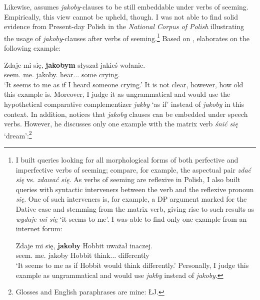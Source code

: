 \documentclass[output=paper
,modfonts
,nonflat]{langsci/langscibook}
\begin{document}
Likewise, \textcite{Wiemer2005} assumes \emph{jakoby}-clauses to be still embeddable under verbs of seeming. Empirically, this view cannot be upheld, though. I was not able to find solid evidence from Present-day Polish in the \emph{National Corpus of Polish} illustrating the usage of \emph{jakoby}-clauses after verbs of seeming.\footnote{I built queries looking for all morphological forms of both perfective and imperfective verbs of seeming; compare, for example, the aspectual pair \emph{zdać się} vs. \emph{zdawać się}. As verbs of seeming are reflexive in Polish, I also built queries with syntactic interveners between the verb and the reflexive pronoun \emph{się}. One of such interveners is, for example, a DP argument marked for the Dative case and stemming from the matrix verb, giving rise to such results as \emph{wydaje mi się} `it seems to me'. I was able to find only one example from an internet forum:

\ea \gll Zdaje mi się, \textbf{jakoby} Hobbit uważał inaczej. \\
		seem.{\thirdperson}{\sg} me.{\dat} {} jakoby Hobbit think.{\lptcp}.{\sg}.{\masc} differently \\
\glt	`It seems to me as if Hobbit would think differently.' 
\z
Personally, I judge this example as ungrammatical and would use \emph{jakby} instead of \emph{jakoby}.}
Based on \textcite{ojasiewicz1992}, \textcite{Wiemer2005} elaborates on the following example:

\ea \gll Zdaje mi się, \textbf{jakobym} słyszał jakieś wołanie. \\
		seem.{\thirdperson}{\sg} me.{\dat} {} jakoby.{\firstperson}{\sg} hear.{\lptcp}.{\sg}.{\masc} some crying.{\acc} \\
\glt	`It seems to me as if I heard someone crying.' 
\z
It is not clear, however, how old this example is. Moreover, I judge it as ungrammatical and would use the hypothetical comparative complementizer \emph{jakby} `as if' instead of \emph{jakoby} in this context. In addition, \textcite[122--124]{Wiemer2005} notices that \emph{jakoby} clauses can be embedded under speech verbs. However, he discusses only one example with the matrix verb \emph{śnić się} `dream':\footnote{Glosses and English paraphrases are mine: ŁJ.
}
\end{document}
